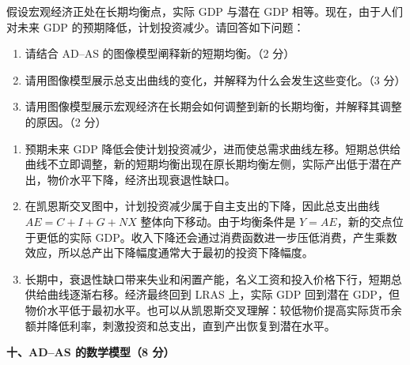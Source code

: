 \begin{question}
假设宏观经济正处在长期均衡点，实际 GDP 与潜在 GDP 相等。现在，由于人们对未来 GDP 的预期降低，计划投资减少。请回答如下问题：
\begin{enumerate}[label=(\alph*),leftmargin=2.5em]
  \item 请结合 AD--AS 的图像模型阐释新的短期均衡。（2 分）
  \item 请用图像模型展示总支出曲线的变化，并解释为什么会发生这些变化。（3 分）
  \item 请用图像模型展示宏观经济在长期会如何调整到新的长期均衡，并解释其调整的原因。（2 分）
\end{enumerate}
\begin{solution}
\begin{enumerate}[label=(\alph*),leftmargin=2.5em]
  \item 预期未来 GDP 降低会使计划投资减少，进而使总需求曲线左移。短期总供给曲线不立即调整，新的短期均衡出现在原长期均衡左侧，实际产出低于潜在产出，物价水平下降，经济出现衰退性缺口。
  \item 在凯恩斯交叉图中，计划投资减少属于自主支出的下降，因此总支出曲线 $AE=C+I+G+NX$ 整体向下移动。由于均衡条件是 $Y=AE$，新的交点位于更低的实际 GDP。收入下降还会通过消费函数进一步压低消费，产生乘数效应，所以总产出下降幅度通常大于最初的投资下降幅度。
  \item 长期中，衰退性缺口带来失业和闲置产能，名义工资和投入价格下行，短期总供给曲线逐渐右移。经济最终回到 LRAS 上，实际 GDP 回到潜在 GDP，但物价水平低于最初水平。也可以从凯恩斯交叉理解：较低物价提高实际货币余额并降低利率，刺激投资和总支出，直到产出恢复到潜在水平。
\end{enumerate}
\end{solution}
\end{question}

\textbf{十、AD--AS 的数学模型（8 分）}

